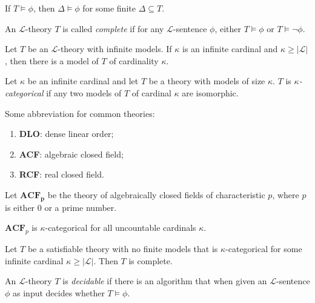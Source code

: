 \documentclass[
	fontsize=10pt, %
]{kaohandt}
\begin{document}
\begin{lemma}
    If $T \models \phi$, then $\Delta \models \phi$ for some finite $\Delta \subseteq T$.
\end{lemma}

\begin{definition}
    An $\mathcal{L}$-theory $T$ is called \emph{complete} if for any $\mathcal{L}$-sentence $\phi$,
    either $T \models \phi$ or $T \models \neg\phi$.
\end{definition}

\begin{proposition}
    Let $T$ be an $\mathcal{L}$-theory with infinite models.
    If $\kappa$ is an infinite cardinal and $\kappa \ge |\mathcal{L}|$,
    then there is a model of $T$ of cardinality $\kappa$.
\end{proposition}

\begin{definition}
    Let $\kappa$ be an infinite cardinal and let $T$ be a theory with models of size $\kappa$.
    $T$ is \emph{$\kappa$-categorical} if any two models of $T$ of cardinal $\kappa$ are isomorphic.
\end{definition}

Some abbreviation for common theories:
\begin{enumerate}[label = {}]
    \item \textbf{DLO}: dense linear order;
    \item \textbf{ACF}: algebraic closed field;
    \item \textbf{RCF}: real closed field.
\end{enumerate}

Let $\mathbf{ACF_p}$ be the theory of algebraically closed fields of characteristic $p$,
where $p$ is either $0$ or a prime number.

\begin{proposition} 
    $\mathbf{ACF}_p$ is $\kappa$-categorical for all uncountable cardinals $\kappa$.
\end{proposition}

\begin{theorem}
    Let $T$ be a satisfiable theory with no finite models that is 
    $\kappa$-categorical for some infinite cardinal $\kappa \ge |\mathcal{L}|$.
    Then $T$ is complete.
\end{theorem}

\begin{definition}
    An $\mathcal{L}$-theory $T$ is \emph{decidable} if there is an algorithm that when given an $\mathcal{L}$-sentence $\phi$ as input decides whether $T \models \phi$.
\end{definition}
\end{document}
